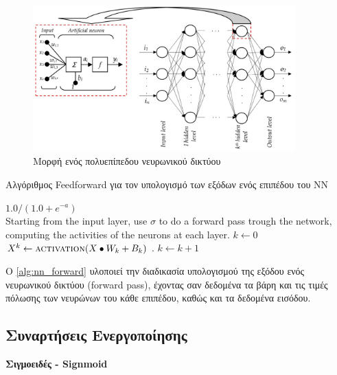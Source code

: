 \begin{figure}[!ht]
  \centering
  \includegraphics[width=0.9\textwidth]{./images/chapter3/multilayer_nn.jpg}
  \caption[Μορφή ενός πολυεπίπεδου νευρωνικού δικτύου]{Μορφή ενός πολυεπίπεδου νευρωνικού δικτύου}
  \label{fig:multilayer_nn}
\end{figure}

\begin{algorithm}[!htp]
  \caption{Αλγόριθμος Feedforward για τον υπολογισμό των εξόδων ενός επιπέδου του ΝΝ}
  \label{alg:nn_forward}
  \begin{algorithmic}[1]
      \State \Return $1.0 / (1.0 + e^{-a})$
    \EndFunction \\
      \State Starting from the input layer, use $\sigma$ to do
         a forward pass trough the network, computing the activities of the
        neurons at each layer.
      \State $k \gets 0$
      \State $X^{k} \gets \Call{activation}{X \bullet W_{k} + B_{k}}$  .
        \State $k \gets k+1$
      \EndWhile
    \EndProcedure
  \end{algorithmic}
\end{algorithm}

Ο \autoref{alg:nn_forward} υλοποιεί την διαδικασία υπολογισμού της εξόδου
ενός νευρωνικού δικτύου (forward pass), έχοντας σαν δεδομένα τα βάρη και τις τιμές πόλωσης
των νευρώνων του κάθε επιπέδου, καθώς και τα δεδομένα εισόδου.


\subsection{Συναρτήσεις Ενεργοποίησης}

\textbf{Σιγμοειδές - Signmoid}

